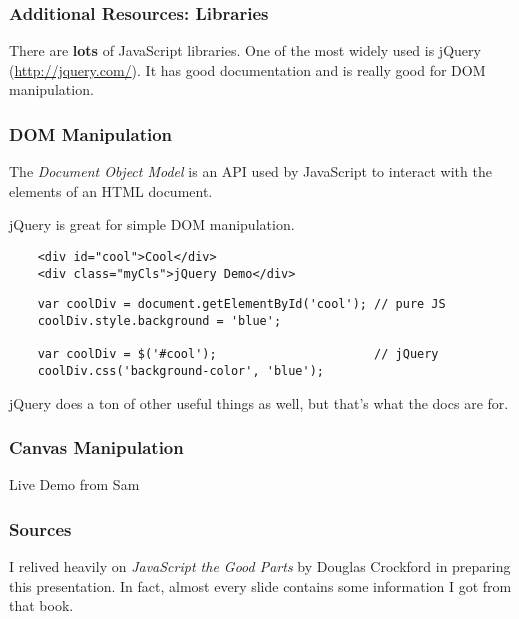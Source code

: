 \documentclass{lug}
\begin{document}
\begin{frame}
    \frametitle{Additional Resources: Libraries}

    There are \textbf{lots} of JavaScript libraries. One of the most widely used is jQuery
    (\url{http://jquery.com/}). It has good documentation and is really good for DOM
    manipulation.\\

\end{frame}

\begin{frame}[fragile]
    \frametitle{DOM Manipulation}
    The \textit{Document Object Model} is an API used by JavaScript to interact with the elements of
    an HTML document.\footnotemark[1]

    jQuery is great for simple DOM manipulation.

    \begin{verbatim}
    <div id="cool">Cool</div>
    <div class="myCls">jQuery Demo</div>
    \end{verbatim}

    \begin{verbatim}
    var coolDiv = document.getElementById('cool'); // pure JS
    coolDiv.style.background = 'blue';

    var coolDiv = $('#cool');                      // jQuery
    coolDiv.css('background-color', 'blue');
    \end{verbatim}

    jQuery does a ton of other useful things as well, but that's what the docs are for.

\end{frame}

\begin{frame}
    \frametitle{Canvas Manipulation}

    Live Demo from Sam
\end{frame}

\begin{frame}
    \frametitle{Sources}

    I relived heavily on \textit{JavaScript the Good Parts} by Douglas Crockford in preparing this
    presentation. In fact, almost every slide contains some information I got from that book.
\end{frame}
\end{document}
